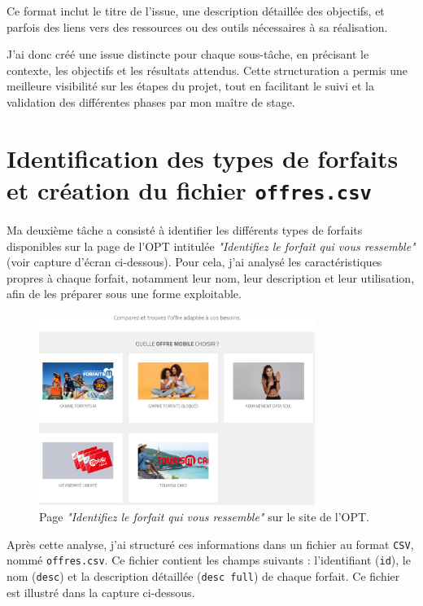 \documentclass{article}
\begin{document}
	Ce format inclut le titre de l’issue, une description détaillée des objectifs, et parfois des liens vers des ressources ou des outils nécessaires à sa réalisation.
	
	J’ai donc créé une issue distincte pour chaque sous-tâche, en précisant le contexte, les objectifs et les résultats attendus. Cette structuration a permis une meilleure visibilité sur les étapes du projet, tout en facilitant le suivi et la validation des différentes phases par mon maître de stage.
	\newpage
	\section{Identification des types de forfaits et création du fichier \texttt{offres.csv}}
	
	Ma deuxième tâche a consisté à identifier les différents types de forfaits disponibles sur la page de l’OPT intitulée \textit{"Identifiez le forfait qui vous ressemble"} (voir capture d’écran ci-dessous). Pour cela, j’ai analysé les caractéristiques propres à chaque forfait, notamment leur nom, leur description et leur utilisation, afin de les préparer sous une forme exploitable.
	
	\begin{figure}[h!]
		\centering
		\includegraphics[width=0.8\textwidth]{asset/page_forfait.png}
		\caption{Page \textit{"Identifiez le forfait qui vous ressemble"} sur le site de l’OPT.}
		\label{fig:page_forfait}
	\end{figure}
	
	Après cette analyse, j’ai structuré ces informations dans un fichier au format \texttt{CSV}, nommé \texttt{offres.csv}. Ce fichier contient les champs suivants : l’identifiant (\texttt{id}), le nom (\texttt{desc}) et la description détaillée (\texttt{desc full}) de chaque forfait. Ce fichier est illustré dans la capture ci-dessous.
	
\end{document}
